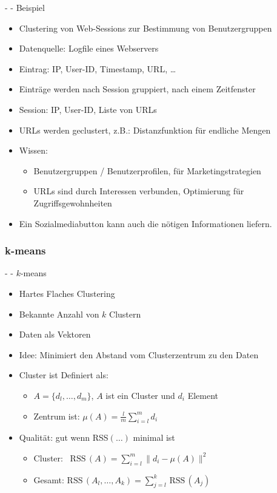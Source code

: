 \documentclass[fleqn,11pt,aspectratio=43]{beamer}
\begin{document}
\begin{frame}{\insertsectionhead - \insertsubsectionhead - Beispiel\cite{ester2000knowledge}}
\begin{itemize}
\item Clustering von Web-Sessions zur Bestimmung von Benutzergruppen
\item Datenquelle: Logfile eines Webservers
\item Eintrag: IP, User-ID, Timestamp, URL, \ldots
\item Einträge werden nach Session gruppiert, nach einem Zeitfenster
\item Session: IP, User-ID, Liste von URLs
\item URLs werden geclustert, z.B.: Distanzfunktion für endliche Mengen
\item Wissen:
\begin{itemize}
\item Benutzergruppen / Benutzerprofilen, für Marketingstrategien 
\item URLs sind durch Interessen verbunden, Optimierung für Zugriffsgewohnheiten 
\end{itemize}
\item Ein Sozialmediabutton kann auch die nötigen Informationen liefern.
\end{itemize}
\end{frame}


\subsubsection{k-means}\label{kmeans}

\begin{frame}{\insertsectionhead - \insertsubsectionhead - $k$-means\cite{dwh}}
\begin{itemize}
\item Hartes Flaches Clustering
\item Bekannte Anzahl von $k$ Clustern
\item Daten als Vektoren
\item Idee: Minimiert den Abstand vom Clusterzentrum zu den Daten
\item Cluster ist Definiert als:
\begin{itemize}
\item $A = \{d_l, \ldots, d_m\}$, $A$ ist ein Cluster und $d_i$ Element 
\item Zentrum ist: $\mu(A) = \frac{l}{m}\sum\limits_{i=l}^{m}{d_i}$
\end{itemize}
\item Qualität: gut wenn RSS$(\ldots)$ minimal ist
\begin{itemize}
\item Cluster: ~$\mbox{RSS}\,(A) = \sum\limits_{i=l}^{m}\big\|d_i - \mu(A)\big\|^2$
\item Gesamt: $\mbox{RSS}\,(A_l, \ldots, A_k) = \sum\limits_{j=l}^{k}\,\mbox{RSS}\,(A_j)$
\end{itemize}
\end{itemize}
\end{frame}
\end{document}
